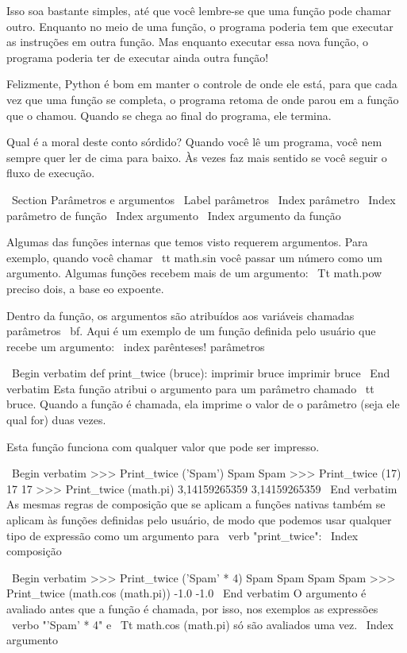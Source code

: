 \documentclass[10pt]{book}
\begin{document}
\begin {itemize}
{Isso soa bastante simples, até que você lembre-se que uma função pode
chamar outro. Enquanto no meio de uma função, o programa poderia
tem que executar as instruções em outra função. Mas enquanto
executar essa nova função, o programa poderia ter de executar ainda
outra função!

Felizmente, Python é bom em manter o controle de onde ele está, para que cada
vez que uma função se completa, o programa retoma de onde parou em
a função que o chamou. Quando se chega ao final do programa,
ele termina.

Qual é a moral deste conto sórdido? Quando você lê um programa, você
nem sempre quer ler de cima para baixo. Às vezes faz
mais sentido se você seguir o fluxo de execução.


\ Section {Parâmetros e argumentos}
\ Label {parâmetros}
\ Index {parâmetro}
\ Index {parâmetro de função}
\ Index {argumento}
\ Index {argumento da função}

Algumas das funções internas que temos visto requerem argumentos. Para
exemplo, quando você chamar {\ tt math.sin} você passar um número
como um argumento. Algumas funções recebem mais de um argumento:
{\ Tt math.pow} preciso dois, a base eo expoente.

Dentro da função, os argumentos são atribuídos aos
variáveis ​​chamadas parâmetros {\ bf}. Aqui é um exemplo de um
função definida pelo usuário que recebe um argumento:
\ index {parênteses! parâmetros}

\ Begin {verbatim}
def print_twice (bruce):
    imprimir bruce
    imprimir bruce
\ End {verbatim}
%
Esta função atribui o argumento para um parâmetro
chamado {\ tt bruce}. Quando a função é chamada, ela imprime o valor de
o parâmetro (seja ele qual for) duas vezes.

Esta função funciona com qualquer valor que pode ser impresso.

\ Begin {verbatim}
>>> Print_twice ('Spam')
Spam
Spam
>>> Print_twice (17)
17
17
>>> Print_twice (math.pi)
3,14159265359
3,14159265359
\ End {verbatim}
%
As mesmas regras de composição que se aplicam a funções nativas também
se aplicam às funções definidas pelo usuário, de modo que podemos usar qualquer tipo de expressão
como um argumento para \ verb "print_twice":
\ Index {composição}

\ Begin {verbatim}
>>> Print_twice ('Spam' * 4)
Spam Spam
Spam Spam
>>> Print_twice (math.cos (math.pi))
-1.0
-1.0
\ End {verbatim}
%
O argumento é avaliado antes que a função é chamada, por isso,
nos exemplos as expressões \ verbo "'Spam' * 4" e
{\ Tt math.cos (math.pi)} só são avaliados uma vez.
\ Index {argumento}

}
\end{itemize}
\end{document}
